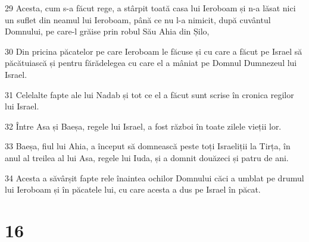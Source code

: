 \par 29 Acesta, cum s-a făcut rege, a stârpit toată casa lui Ieroboam și n-a lăsat nici un suflet din neamul lui Ieroboam, până ce nu l-a nimicit, după cuvântul Domnului, pe care-l grăise prin robul Său Ahia din Șilo,
\par 30 Din pricina păcatelor pe care Ieroboam le făcuse și cu care a făcut pe Israel să păcătuiască și pentru fărădelegea cu care el a mâniat pe Domnul Dumnezeul lui Israel.
\par 31 Celelalte fapte ale lui Nadab și tot ce el a făcut sunt scrise în cronica regilor lui Israel.
\par 32 Între Asa și Baeșa, regele lui Israel, a fost război în toate zilele vieții lor.
\par 33 Baeșa, fiul lui Ahia, a început să domnească peste toți Israeliții la Tirța, în anul al treilea al lui Asa, regele lui Iuda, și a domnit douăzeci și patru de ani.
\par 34 Acesta a săvârșit fapte rele înaintea ochilor Domnului căci a umblat pe drumul lui Ieroboam și în păcatele lui, cu care acesta a dus pe Israel în păcat.

\chapter{16}


